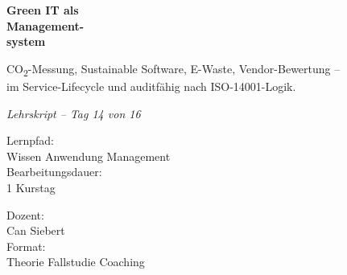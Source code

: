 \documentclass[11pt,a4paper,oneside]{article}
\newcommand{\caveatfontfallback}{\itshape}
\newcommand\caveatfont{\caveatfontfallback}%
\begin{document}
\begin{titlepage}
  \pagestyle{empty}
  \vspace*{1.5cm}
  \\[2pt]
  \noindent{\color{lpAccent}\rule{\linewidth}{1.2pt}}\\[4pt]

  \vspace{3cm}
  {\sffamily\fontsize{30}{34}\selectfont\bfseries\color{lpInk}Green IT als\\Management-\\system\par}

  \vspace{0.7cm}
  {\sffamily\large\color{lpGray}CO\textsubscript{2}-Messung, Sustainable Software, E-Waste, Vendor-Bewertung --\\im Service-Lifecycle und auditfähig nach ISO-14001-Logik.\par}

  \vspace{1.5cm}
  {\caveatfont\LARGE\color{lpAmber}Lehrskript -- Tag 14 von 16}\par

  \vfill

  \noindent\begin{minipage}{0.55\linewidth}
    {\sffamily\footnotesize\color{lpGray}Lernpfad:}\\
    {\sffamily\small\color{lpInk}Wissen \textrightarrow{} Anwendung \textrightarrow{} Management}\\[10pt]
    {\sffamily\footnotesize\color{lpGray}Bearbeitungsdauer:}\\
    {\sffamily\small\color{lpInk}1 Kurstag}
  \end{minipage}\hfill
  \begin{minipage}{0.4\linewidth}
    \raggedleft
    {\sffamily\footnotesize\color{lpGray}Dozent:}\\
    {\sffamily\small\color{lpInk}Can Siebert}\\[10pt]
    {\sffamily\footnotesize\color{lpGray}Format:}\\
    {\sffamily\small\color{lpInk}Theorie \textperiodcentered{} Fallstudie \textperiodcentered{} Coaching}
  \end{minipage}

  \vspace{0.5cm}
  \noindent{\color{lpAccent}\rule{\linewidth}{0.6pt}}
\end{titlepage}
\end{document}
